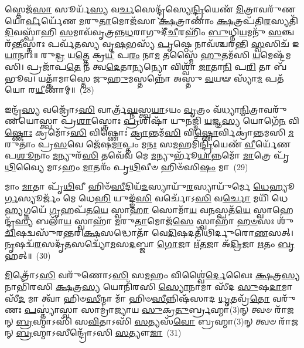 𑌸𑍍𑌤𑍇𑌜᳴\-\ul{𑌸𑌾} 𑌸𑍂𑌰𑍍𑌯᳴\-\ul{𑌸𑍍𑌯} 𑌵\-\ul{𑌰𑍍𑌚}\-𑌸𑍇𑌨𑍍𑌦𑍍𑌰᳴𑌸𑍍𑌯𑍇\-\ul{𑌨𑍍𑌦𑍍𑌰𑌿}\-𑌯𑍇𑌣᳴ \ul{𑌮𑌿}\-𑌤𑍍𑌰𑌾𑌵𑌰𑍁᳴𑌣𑌯𑍋\-\ul{𑌰𑍍𑌵𑍀}\-𑌰𑍍𑌯𑍇᳴𑌣 \ul{𑌮}\-𑌰𑍁\-\ul{𑌤𑌾}\-𑌮𑍋𑌜᳴𑌸𑌾 \ul{𑌕𑍍𑌷}\-𑌤𑍍𑌰𑌾𑌣𑌾𑌂॑ \ul{𑌕𑍍𑌷}\-𑌤𑍍𑌰𑌪᳴𑌤𑌿\-\ul{𑌰}\-𑌸𑍍𑌯𑌤𑌿᳴ \ul{𑌦𑌿}\-𑌵𑌸𑍍𑌪𑌾᳴𑌹𑌿 \ul{𑌸}\-𑌮𑌾𑌵᳴𑌵𑍃𑌤𑍍𑌰𑌨𑍍𑌨\-\ul{𑌧}\-𑌰𑌾𑌗𑍁𑌦𑍀᳴\-\ul{𑌚𑍀}\-𑌰𑌹𑌿𑌂᳴ \ul{𑌬𑍁}\-𑌧𑍍𑌨𑌿\-\ul{𑌯}\-𑌮𑌨𑍁᳴ \ul{𑌸}\-𑌞𑍍𑌚𑌰᳴\-\ul{𑌨𑍍𑌤𑍀}\-𑌸𑍍𑌤𑌾𑌃 𑌪𑌰𑍍𑌵᳴𑌤𑌸𑍍𑌯 𑌵𑍃\-\ul{𑌷}\-𑌭𑌸𑍍𑌯᳴ \ul{𑌪𑍃}\-𑌷𑍍𑌠𑍇 𑌨𑌾𑌵᳴𑌶𑍍𑌚𑌰𑌨𑍍𑌤𑌿 \ul{𑌸𑍍𑌵}\-𑌸𑌿𑌚᳴ 𑌇\-\ul{𑌯𑌾}\-𑌨𑌾𑌃॥ 𑌰𑍁\-\ul{𑌦𑍍𑌰} 𑌯\-\ul{𑌤𑍍𑌤𑍇} 𑌕𑍍𑌰\-\ul{𑌯𑍀} 𑌪\-\ul{𑌰𑌂} 𑌨𑌾\-\ul{𑌮} 𑌤𑌸𑍍𑌮𑍈᳴ \ul{𑌹𑍁}\-𑌤𑌮᳴𑌸𑌿 \ul{𑌯}\-𑌮𑍇𑌷𑍍𑌟᳴𑌮𑌸𑌿। 𑌪𑍍𑌰𑌜𑌾᳴𑌪\-\ul{𑌤𑍇} 𑌨 𑌤𑍍𑌵\-\ul{𑌦𑍇}\-𑌤𑌾\-\ul{𑌨𑍍𑌯}\-𑌨𑍍𑌯𑍋 𑌵𑌿𑌶𑍍𑌵𑌾᳴ \ul{𑌜𑌾}\-𑌤𑌾\-\ul{𑌨𑌿} 𑌪\-\ul{𑌰𑌿} 𑌤𑌾 𑌬᳴𑌭𑍂𑌵। 𑌯𑌤𑍍𑌕𑌾᳴𑌮𑌾𑌸𑍍𑌤𑍇 𑌜𑍁\-\ul{𑌹𑍁}\-𑌮𑌸𑍍𑌤𑌨𑍍𑌨𑍋᳴ 𑌅𑌸𑍍𑌤𑍁 \ul{𑌵}\-𑌯𑍟 𑌸𑍍𑌯𑌾᳴\-\ul{𑌮} 𑌪𑌤᳴𑌯𑍋 𑌰\-\ul{𑌯𑍀}\-𑌣𑌾𑌮𑍍॥~(28)

{\anuvakamend[{\-\ul{𑌅}\-𑌗𑍍𑌨𑍇𑌸𑍍𑌤𑍈𑌕𑌾᳴\-𑌦𑌶 𑌚}]}%

𑌇𑌨𑍍𑌦𑍍𑌰᳴\-\ul{𑌸𑍍𑌯} 𑌵𑌜𑍍𑌰𑍋᳴\-𑌽\-\ul{𑌸𑌿} 𑌵𑌾𑌰𑍍𑌤𑍍𑌰᳴\-\ul{𑌘𑍍𑌨}\-𑌸𑍍𑌤𑍍𑌵\-\ul{𑌯𑌾}\-\-𑌽𑌯𑌂 \ul{𑌵𑍃}\-𑌤𑍍𑌰𑌂 𑌵᳴𑌧𑍍𑌯𑌾\-\ul{𑌨𑍍𑌮𑌿}\-𑌤𑍍𑌰𑌾𑌵𑌰𑍁᳴𑌣\-𑌯𑍋𑌸𑍍𑌤𑍍𑌵𑌾 𑌪𑍍𑌰\-\ul{𑌶𑌾}\-𑌸𑍍𑌤𑍍𑌰𑍋𑌃 \ul{𑌪𑍍𑌰}\-𑌶𑌿𑌷𑌾᳴ 𑌯𑍁𑌨𑌜𑍍𑌮𑌿 \ul{𑌯}\-𑌜𑍍𑌞\-\ul{𑌸𑍍𑌯} 𑌯𑍋𑌗𑍇᳴\-\ul{𑌨} 𑌵𑌿\-\ul{𑌷𑍍𑌣𑍋𑌃} 𑌕𑍍𑌰𑌮𑍋᳴\-𑌽\-\ul{𑌸𑌿} 𑌵𑌿𑌷𑍍𑌣𑍋𑌃॑ \ul{𑌕𑍍𑌰𑌾}\-𑌨𑍍𑌤𑌮᳴\-\ul{𑌸𑌿} 𑌵𑌿\-\ul{𑌷𑍍𑌣𑍋}\-𑌰𑍍𑌵𑌿𑌕𑍍𑌰𑌾॑𑌨𑍍𑌤𑌮𑌸𑌿 \ul{𑌮}\-𑌰𑍁𑌤𑌾𑌂॑ 𑌪𑍍𑌰\-\ul{𑌸}\-𑌵𑍇 𑌜𑍇᳴𑌷\-\ul{𑌮𑌾}\-𑌪𑍍𑌤𑌂 𑌮\-\ul{𑌨𑌃} 𑌸\-\ul{𑌮}\-𑌹𑌮𑌿᳴\-\ul{𑌨𑍍𑌦𑍍𑌰𑌿}\-𑌯𑍇𑌣᳴ \ul{𑌵𑍀}\-𑌰𑍍𑌯𑍇᳴𑌣 𑌪\-\ul{𑌶𑍂}\-𑌨𑌾𑌂 \ul{𑌮}\-𑌨𑍍𑌯𑍁𑌰᳴\-\ul{𑌸𑌿} 𑌤𑌵𑍇᳴𑌵 𑌮𑍇 \ul{𑌮}\-𑌨𑍍𑌯𑍁𑌰𑍍𑌭𑍂᳴\-\ul{𑌯𑌾}\-𑌨𑍍𑌨𑌮𑍋᳴ \ul{𑌮𑌾}\-𑌤𑍍𑌰𑍇 𑌪𑍃᳴\-\ul{𑌥𑌿}\-𑌵𑍍𑌯𑍈 𑌮𑌾\-𑌽𑌹𑌂 \ul{𑌮𑌾}\-𑌤𑌰𑌂᳴ 𑌪𑍃\-\ul{𑌥𑌿}\-𑌵𑍀𑍞 𑌹𑌿𑍞᳴𑌸𑌿\-\ul{𑌷𑌂} 𑌮𑌾~(29)

𑌮𑌾𑌂 \ul{𑌮𑌾}\-𑌤𑌾 𑌪𑍃᳴\-\ul{𑌥𑌿}\-𑌵𑍀 𑌹𑌿𑍞᳴\-\ul{𑌸𑍀}\-𑌦𑌿𑌯᳴\-\ul{𑌦}\-𑌸𑍍𑌯𑌾𑌯𑍁᳴\-\ul{𑌰}\-𑌸𑍍𑌯𑌾𑌯𑍁᳴𑌰𑍍𑌮𑍇 \ul{𑌧𑍇}\-𑌹𑍍𑌯𑍂\-\ul{𑌰𑍍𑌗}\-𑌸𑍍𑌯𑍂𑌰𑍍𑌜𑌂᳴ 𑌮𑍇 𑌧𑍇\-\ul{𑌹𑌿} 𑌯𑍁𑌙𑍍𑌙᳴\-\ul{𑌸𑌿} 𑌵𑌰𑍍𑌚𑍋᳴\-𑌽\-\ul{𑌸𑌿} 𑌵\-\ul{𑌰𑍍𑌚𑍋} 𑌮𑌯𑌿᳴ 𑌧𑍇\-\ul{𑌹𑍍𑌯}\-𑌗𑍍𑌨𑌯𑍇᳴ \ul{𑌗𑍃}\-𑌹𑌪᳴𑌤\-\ul{𑌯𑍇} 𑌸𑍍𑌵𑌾\-\ul{𑌹𑌾} 𑌸𑍋𑌮𑌾᳴\-\ul{𑌯} 𑌵\-\ul{𑌨}\-𑌸𑍍𑌪𑌤᳴\-\ul{𑌯𑍇} 𑌸𑍍𑌵𑌾𑌹𑍇𑌨𑍍𑌦𑍍𑌰᳴\-\ul{𑌸𑍍𑌯} 𑌬𑌲𑌾᳴\-\ul{𑌯} 𑌸𑍍𑌵𑌾𑌹𑌾᳴ \ul{𑌮}\-𑌰𑍁\-\ul{𑌤𑌾}\-𑌮𑍋𑌜᳴\-\ul{𑌸𑍇} 𑌸𑍍𑌵𑌾𑌹𑌾᳴ \ul{𑌹}\-\-\ul{𑍞}\-𑌸𑌃 𑌶𑍁᳴\-\ul{𑌚𑌿}\-𑌷𑌦𑍍𑌵𑌸𑍁᳴𑌰𑌨𑍍𑌤𑌰𑌿\-\ul{𑌕𑍍𑌷}\-\-𑌸𑌦𑍍𑌧𑍋𑌤𑌾᳴ 𑌵𑍇\-\ul{𑌦𑌿}\-𑌷𑌦𑌤𑌿᳴𑌥𑌿𑌰𑍍𑌦𑍁𑌰𑍋\-\ul{𑌣}\-𑌸𑌤𑍍। \ul{𑌨𑍃}\-𑌷𑌦𑍍𑌵᳴\-\ul{𑌰}\-𑌸𑌦𑍃᳴\-\ul{𑌤}\-𑌸𑌦𑍍𑌵𑍍𑌯𑍋᳴\-\ul{𑌮}\-𑌸\-\ul{𑌦}\-𑌬𑍍𑌜𑌾 \ul{𑌗𑍋}\-𑌜𑌾 𑌋᳴\-\ul{𑌤}\-𑌜𑌾 𑌅᳴\-\ul{𑌦𑍍𑌰𑌿}\-𑌜𑌾 \ul{𑌋}\-𑌤𑌂 \ul{𑌬𑍃}\-𑌹𑌤𑍍॥~(30)

{\anuvakamend[{\-\ul{𑌹𑌿}\-\-\ul{𑍞}\-\-\ul{𑌸𑌿}\-\-\ul{𑌷𑌂} 𑌮\-\ul{𑌰𑍍𑌤}\-𑌜𑌾𑌸𑍍𑌤𑍍𑌰𑍀𑌣𑌿᳴ 𑌚}]}%

\-\ul{𑌮𑌿}\-𑌤𑍍𑌰𑍋᳴\-𑌽\-\ul{𑌸𑌿} 𑌵𑌰𑍁᳴𑌣𑍋\-𑌽\-\ul{𑌸𑌿} 𑌸\-\ul{𑌮}\-𑌹𑌂 𑌵𑌿𑌶𑍍𑌵𑍈॑\-\ul{𑌰𑍍𑌦𑍇}\-𑌵𑍈𑌃 \ul{𑌕𑍍𑌷}\-𑌤𑍍𑌰\-\ul{𑌸𑍍𑌯} 𑌨𑌾𑌭𑌿᳴𑌰𑌸𑌿 \ul{𑌕𑍍𑌷}\-𑌤𑍍𑌰\-\ul{𑌸𑍍𑌯} 𑌯𑍋𑌨𑌿᳴𑌰𑌸𑌿 \ul{𑌸𑍍𑌯𑍋}\-𑌨𑌾𑌮𑌾 𑌸𑍀᳴𑌦 \ul{𑌸𑍁}\-𑌷\-\ul{𑌦𑌾}\-𑌮𑌾 𑌸𑍀᳴\-\ul{𑌦} 𑌮𑌾 𑌤𑍍𑌵𑌾᳴ 𑌹𑌿𑍞\-\ul{𑌸𑍀}\-𑌨𑍍𑌮𑌾 𑌮𑌾᳴ 𑌹𑌿𑍞\-\ul{𑌸𑍀}\-𑌨𑍍𑌨𑌿𑌷᳴𑌸𑌾𑌦 \ul{𑌧𑍃}\-𑌤𑌵𑍍𑌰᳴\-\ul{𑌤𑍋} 𑌵𑌰𑍁᳴𑌣𑌃 \ul{𑌪}\-𑌸𑍍𑌤𑍍𑌯𑌾॑𑌸𑍍𑌵𑌾 𑌸𑌾𑌮𑍍𑌰𑌾॑𑌜𑍍𑌯𑌾𑌯 \ul{𑌸𑍁}\-𑌕𑍍𑌰\-\ul{𑌤𑍁}\-𑌰𑍍𑌬𑍍𑌰𑌹𑍍𑌮𑌾(3)𑌨𑍍 𑌤𑍍𑌵𑍞 𑌰𑌾᳴𑌜𑌨𑍍 \ul{𑌬𑍍𑌰}\-𑌹𑍍𑌮𑌾\-𑌽𑌸𑌿᳴ 𑌸\-\ul{𑌵𑌿}\-𑌤𑌾\-𑌽𑌸𑌿᳴ \ul{𑌸}\-𑌤𑍍𑌯𑌸᳴\-\ul{𑌵𑍋} 𑌬𑍍𑌰𑌹𑍍𑌮𑌾(3)𑌨𑍍 𑌤𑍍𑌵𑍞 𑌰𑌾᳴𑌜𑌨𑍍 \ul{𑌬𑍍𑌰}\-𑌹𑍍𑌮𑌾\-𑌽𑌸𑍀𑌨𑍍𑌦𑍍𑌰𑍋᳴\-𑌽𑌸𑌿 \ul{𑌸}\-𑌤𑍍𑌯𑍗\-\ul{𑌜𑌾}\-~(31)

